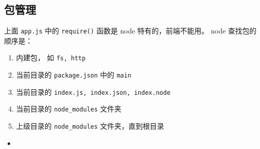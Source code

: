\subsection{包管理}

上面 \verb`app.js` 中的 \verb`require()` 函数是 node 特有的，前端不能用。
node 查找包的顺序是：
\begin{enumerate}
\item 内建包， 如 \verb`fs, http`
\item 当前目录的 \verb`package.json` 中的 \verb`main`
\item 当前目录的 \verb`index.js, index.json, index.node`
\item 当前目录的 \verb`node_modules` 文件夹
\item 上级目录的 \verb`node_modules` 文件夹，直到根目录
\end{enumerate}

\begin{itemize}
\item 
\end{itemize}
